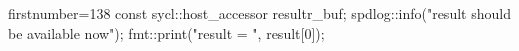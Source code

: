 \begin{cppcode*}{firstnumber=138}
        const sycl::host_accessor result{r_buf};
        spdlog::info("result should be available now");
        fmt::print("result = {}\n", result[0]);
\end{cppcode*}
